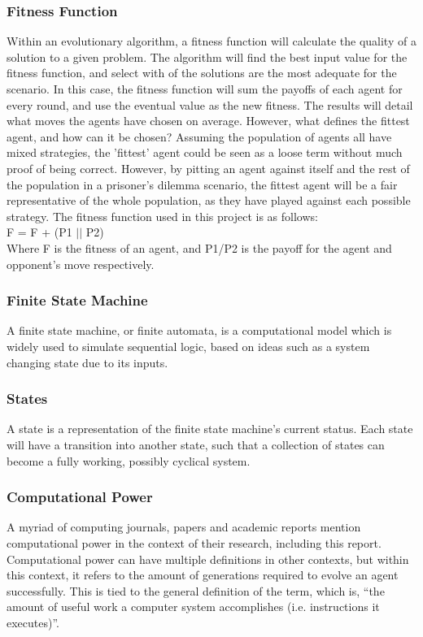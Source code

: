 \documentclass[12pt,a4paper]{article}
\begin{document}
\subsubsection{Fitness Function}
Within an evolutionary algorithm, a fitness function will calculate the quality of a solution to a given problem. The algorithm will find the best input value for the fitness function, and select with of the solutions are the most adequate for the scenario. In this case, the fitness function will sum the payoffs of each agent for every round, and use the eventual value as the new fitness. The results will detail what moves the agents have chosen on average. However, what defines the fittest agent, and how can it be chosen? Assuming the population of agents all have mixed strategies, the 'fittest' agent could be seen as a loose term without much proof of being correct. However, by pitting an agent against itself and the rest of the population in a prisoner's dilemma scenario, the fittest agent will be a fair representative of the whole population, as they have played against each possible strategy. The fitness function used in this project is as follows: \\

F = F + (P1 $||$  P2) \\

Where F is the fitness of an agent, and P1/P2 is the payoff for the agent and opponent's move respectively.

\subsubsection{Finite State Machine}
A finite state machine, or finite automata, is a computational model which is widely used to simulate sequential logic, based on ideas such as a system changing state due to its inputs.

\subsubsection{States}
A state is a representation of the finite state machine's current status. Each state will have a transition into another state, such that a collection of states can become a fully working, possibly cyclical system.

\subsubsection{Computational Power}
A myriad of computing journals, papers and academic reports mention computational power in the context of their research, including this report. Computational power can have multiple definitions in other contexts, but within this context, it refers to the amount of generations required to evolve an agent successfully. This is tied to the general definition of the term, which is, “the amount of useful work a computer system accomplishes (i.e. instructions it executes)”.
\end{document}
